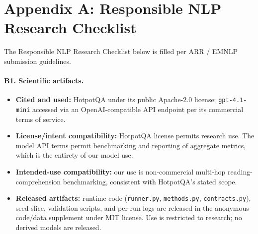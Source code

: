 \section*{Appendix A: Responsible NLP Research Checklist}

The Responsible NLP Research Checklist below is filled per ARR / EMNLP submission guidelines.

\paragraph{B1. Scientific artifacts.}
\begin{itemize}\setlength\itemsep{1pt}
\item \textbf{Cited and used:} HotpotQA \citep{yang2018hotpotqa} under its public Apache-2.0 license; \texttt{gpt-4.1-mini} accessed via an OpenAI-compatible API endpoint per its commercial terms of service.
\item \textbf{License/intent compatibility:} HotpotQA license permits research use. The model API terms permit benchmarking and reporting of aggregate metrics, which is the entirety of our model use.
\item \textbf{Intended-use compatibility:} our use is non-commercial multi-hop reading-comprehension benchmarking, consistent with HotpotQA's stated scope.
\item \textbf{Released artifacts:} runtime code (\texttt{runner.py}, \texttt{methods.py}, \texttt{contracts.py}), seed slice, validation scripts, and per-run logs are released in the anonymous code/data supplement under MIT license. Use is restricted to research; no derived models are released.
\end{itemize}

